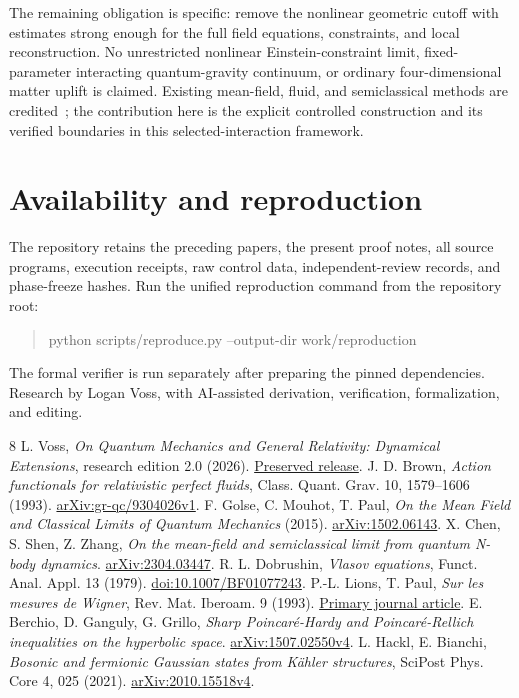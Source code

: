 \documentclass[11pt]{article}
\begin{document}
The remaining obligation is specific: remove the nonlinear geometric cutoff with estimates strong enough for the full field equations, constraints, and local reconstruction. No unrestricted nonlinear Einstein-constraint limit, fixed-parameter interacting quantum-gravity continuum, or ordinary four-dimensional matter uplift is claimed. Existing mean-field, fluid, and semiclassical methods are credited~\cite{GMP,Chen,Dobrushin}; the contribution here is the explicit controlled construction and its verified boundaries in this selected-interaction framework.

\section*{Availability and reproduction}
The repository retains the preceding papers, the present proof notes, all source programs, execution receipts, raw control data, independent-review records, and phase-freeze hashes. Run the unified reproduction command from the repository root:
\begin{quote}\small\ttfamily
python scripts/reproduce.py --output-dir work/reproduction
\end{quote}
The formal verifier is run separately after preparing the pinned dependencies. Research by Logan Voss, with AI-assisted derivation, verification, formalization, and editing.

\begin{thebibliography}{8}
 L. Voss, \emph{On Quantum Mechanics and General Relativity: Dynamical Extensions}, research edition 2.0 (2026). \href{https://github.com/LoganVoss/on-quantum-mechanics-and-general-relativity/releases/tag/v2.0.1}{Preserved release}.
 J. D. Brown, \emph{Action functionals for relativistic perfect fluids}, Class. Quant. Grav. 10, 1579--1606 (1993). \href{https://arxiv.org/abs/gr-qc/9304026v1}{arXiv:gr-qc/9304026v1}.
 F. Golse, C. Mouhot, T. Paul, \emph{On the Mean Field and Classical Limits of Quantum Mechanics} (2015). \href{https://arxiv.org/abs/1502.06143}{arXiv:1502.06143}.
 X. Chen, S. Shen, Z. Zhang, \emph{On the mean-field and semiclassical limit from quantum N-body dynamics}. \href{https://arxiv.org/abs/2304.03447}{arXiv:2304.03447}.
 R. L. Dobrushin, \emph{Vlasov equations}, Funct. Anal. Appl. 13 (1979). \href{https://doi.org/10.1007/BF01077243}{doi:10.1007/BF01077243}.
 P.-L. Lions, T. Paul, \emph{Sur les mesures de Wigner}, Rev. Mat. Iberoam. 9 (1993). \href{https://ems.press/journals/rmi/articles/5283}{Primary journal article}.
 E. Berchio, D. Ganguly, G. Grillo, \emph{Sharp Poincaré-Hardy and Poincaré-Rellich inequalities on the hyperbolic space}. \href{https://arxiv.org/abs/1507.02550v4}{arXiv:1507.02550v4}.
 L. Hackl, E. Bianchi, \emph{Bosonic and fermionic Gaussian states from Kähler structures}, SciPost Phys. Core 4, 025 (2021). \href{https://arxiv.org/abs/2010.15518v4}{arXiv:2010.15518v4}.
\end{thebibliography}
\end{document}
